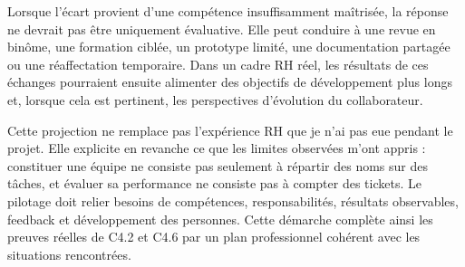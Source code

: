 Lorsque l'écart provient d'une compétence insuffisamment maîtrisée, la réponse ne devrait pas être uniquement évaluative. Elle peut conduire à une revue en binôme, une formation ciblée, un prototype limité, une documentation partagée ou une réaffectation temporaire. Dans un cadre RH réel, les résultats de ces échanges pourraient ensuite alimenter des objectifs de développement plus longs et, lorsque cela est pertinent, les perspectives d'évolution du collaborateur.

Cette projection ne remplace pas l'expérience RH que je n'ai pas eue pendant le projet. Elle explicite en revanche ce que les limites observées m'ont appris : constituer une équipe ne consiste pas seulement à répartir des noms sur des tâches, et évaluer sa performance ne consiste pas à compter des tickets. Le pilotage doit relier besoins de compétences, responsabilités, résultats observables, feedback et développement des personnes. Cette démarche complète ainsi les preuves réelles de C4.2 et C4.6 par un plan professionnel cohérent avec les situations rencontrées.
